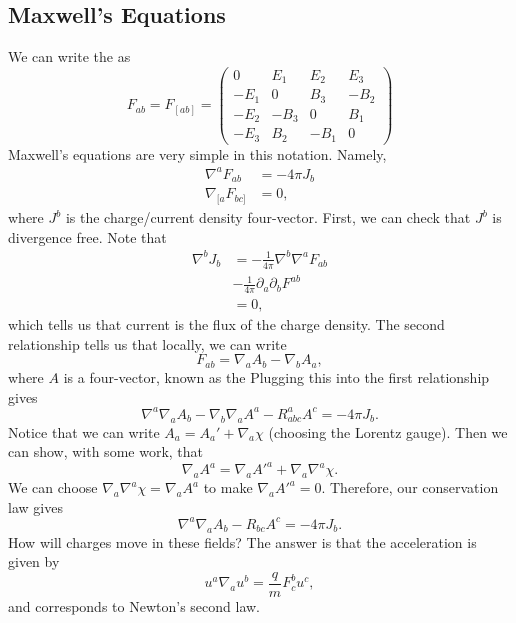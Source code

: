 \documentclass{article}
\numberwithin{equation}{section}
\begin{document}
\subsection{Maxwell's Equations}
We can write the  as 
\begin{equation*}
    F_{ab} = F_{[ab]} =
    \begin{pmatrix}
        0 & E_{1} & E_{2} & E_{3} \\
        -E_{1} & 0 & B_{3} & -B_{2} \\
        -E_{2} & -B_{3} & 0 & B_{1} \\
        -E_{3} & B_{2} & -B_{1} & 0
    \end{pmatrix}
\end{equation*}
Maxwell's equations are very simple in this notation. Namely,
\begin{align*}
    \nabla^a F_{ab} &= -4\pi J_b \\ 
    \nabla_{[a}F_{bc]} &= 0,
\end{align*}
where $J^b$ is the charge/current density four-vector. First, we can check that $J^b$ is divergence free. Note that 
\begin{align*}
    \nabla^b J_b &= -\frac{1}{4\pi} \nabla^b\nabla^a F_{ab} \\ 
    &-\frac{1}{4\pi}\partial_a\partial_b F^{ab} \\ 
    &= 0,
\end{align*}
which tells us that current is the flux of the charge density. The second relationship tells us that locally, we can write 
\begin{equation*}
    F_{ab} = \nabla_a A_b - \nabla_b A_a,
\end{equation*}
where $A$ is a four-vector, known as the  Plugging this into the first relationship gives 
\begin{equation*}
    \nabla^a\nabla_a A_b - \nabla_b\nabla_a A^a - R_{abc}^a A^c = -4\pi J_b.
\end{equation*}
Notice that we can write $A_a = A_a' + \nabla_a \chi$ (choosing the Lorentz gauge). Then we can show, with some work, that 
\begin{equation*}
    \nabla_a A^a = \nabla_a A'^{a} + \nabla_a\nabla^a \chi.
\end{equation*}
We can choose $\nabla_a\nabla^a \chi = \nabla_a A^a$ to make $\nabla_a A'^a = 0.$ Therefore, our conservation law gives 
\begin{equation*}
    \nabla^a\nabla_a A_b - R_{bc} A^c = - 4\pi J_b.
\end{equation*}
How will charges move in these fields? The answer is that the acceleration is given by 
\begin{equation*}
    u^a \nabla_a u^b = \frac{q}{m} F^b_c u^c,
\end{equation*}
and corresponds to Newton's second law.
\end{document}
